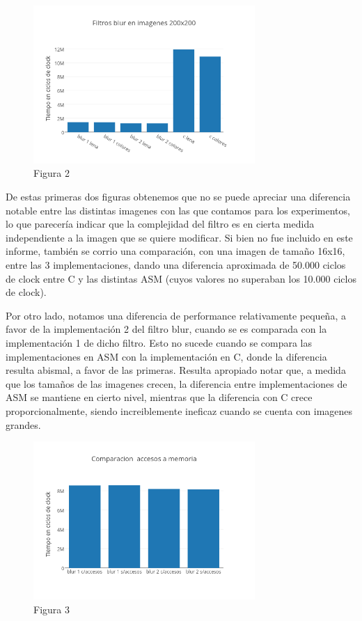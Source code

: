 \documentclass[a4paper]{article}
\begin{document}
\begin{figure}[h]
  \centering
    \includegraphics[width=0.75\textwidth]{imagenes/FiltrosBlurEnImagenes200x200.png}
  \caption{Figura 2}
  \label{fig:graficoblur2}
\end{figure}
 \FloatBarrier

De estas primeras dos figuras obtenemos que no se puede apreciar una diferencia notable entre las distintas imagenes con las que contamos para los experimentos, lo que parecería indicar que la complejidad del filtro es en cierta medida independiente a la imagen que se quiere modificar. Si bien no fue incluido en este informe, también se corrio una comparación, con una imagen de tamaño 16x16, entre las 3 implementaciones, dando una diferencia aproximada de 50.000 ciclos de clock entre C y las distintas ASM (cuyos valores no superaban los 10.000 ciclos de clock).

Por otro lado, notamos una diferencia de performance relativamente pequeña, a favor de la implementación 2 del filtro blur, cuando se es comparada con la implementación 1 de dicho filtro. Esto no sucede cuando se compara las implementaciones en ASM con la implementación en C, donde la diferencia resulta abismal, a favor de las primeras. Resulta apropiado notar que, a medida que los tamaños de las imagenes crecen, la diferencia entre implementaciones de ASM se mantiene en cierto nivel, mientras que la diferencia con C crece proporcionalmente, siendo increiblemente ineficaz cuando se cuenta con imagenes grandes.

\begin{figure}[h]
  \centering
    \includegraphics[width=0.75\textwidth]{imagenes/ComparacionAccesosAMemoriaBlurColores.png}
  \caption{Figura 3}
  \label{fig:graficoblur3}
\end{figure}
 \FloatBarrier
\end{document}
